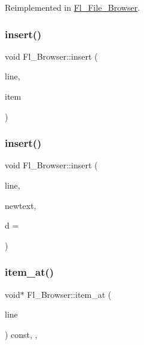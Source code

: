 Reimplemented in \hyperlink{class_fl___file___browser_a6b259e0fcbe561e4c7252d784fbd7dc2}{Fl\+\_\+\+File\+\_\+\+Browser}.

\mbox{\label{class_fl___browser_aba85896ae1a452e59f53e5de979deabf}} 
\subsubsection{\texorpdfstring{insert()}{insert()}\hspace{0.1cm}{\footnotesize\ttfamily [1/2]}}
{\footnotesize\ttfamily void Fl\+\_\+\+Browser\+::insert (\begin{DoxyParamCaption}\item[{int}]{line,  }\item[{F\+L\+\_\+\+B\+L\+I\+NE $\ast$}]{item }\end{DoxyParamCaption})\hspace{0.3cm}{\ttfamily [protected]}}

\mbox{\label{class_fl___browser_a1c2d8c2a3168ec8308efb5ce3a277238}} 
\subsubsection{\texorpdfstring{insert()}{insert()}\hspace{0.1cm}{\footnotesize\ttfamily [2/2]}}
{\footnotesize\ttfamily void Fl\+\_\+\+Browser\+::insert (\begin{DoxyParamCaption}\item[{int}]{line,  }\item[{const char $\ast$}]{newtext,  }\item[{void $\ast$}]{d = {} }\end{DoxyParamCaption})}

\mbox{\label{class_fl___browser_aa1d22a122c794581b30183f045db2959}} 
\subsubsection{\texorpdfstring{item\+\_\+at()}{item\_at()}}
{\footnotesize\ttfamily void$\ast$ Fl\+\_\+\+Browser\+::item\+\_\+at (\begin{DoxyParamCaption}\item[{int}]{line }\end{DoxyParamCaption}) const\hspace{0.3cm}{\ttfamily [inline]}, {\ttfamily [protected]}, {\ttfamily [virtual]}}

